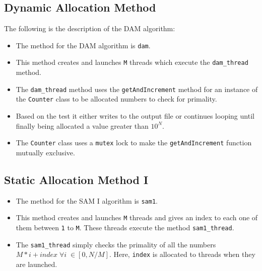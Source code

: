 \documentclass[a4paper,12pt]{report}
\begin{document}
\subsection{Dynamic Allocation Method}
The following is the description of the DAM algorithm:
\begin{itemize}
\item The method for the DAM algorithm is \texttt{dam}.
\item This method creates and launches \texttt{M} threads which execute the \texttt{dam\_thread} method.
\item The \texttt{dam\_thread} method uses the \texttt{getAndIncrement} method for an instance of the \texttt{Counter} class to be allocated numbers to check for primality.
\item Based on the test it either writes to the output file or continues looping until finally being allocated a value greater than $10^{N}$.
\item The \texttt{Counter} class uses a \texttt{mutex} lock to make the \texttt{getAndIncrement} function mutually exclusive.
\end{itemize}
\subsection{Static Allocation Method I}
\begin{itemize}
\item The method for the SAM I algorithm is \texttt{sam1}.
\item This method creates and launches \texttt{M} threads and gives an index to each one of them between \texttt{1} to \texttt{M}. These threads execute the method \texttt{sam1\_thread}.
\item The \texttt{sam1\_thread} simply checks the primality of all the numbers \\$M*i + index \; \forall i \; \in [0, N/M]$. Here, \texttt{index} is allocated to threads when they are launched.
\end{itemize}
\end{document}
